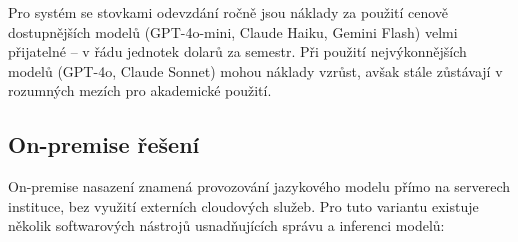 \begin{table}[H]
    \centering
    \caption{Přibližné ceny vybraných cloudových API modelů (stav 2024--2025) \cite{openai_api, anthropic_api, google_vertex}. Náklady na jedno odevzdání jsou orientační výpočet pro vstup 4\,000 tokenů a výstup 1\,000 tokenů.}
    \label{tab:cloud-api-costs}
\end{table}

Pro systém se stovkami odevzdání ročně jsou náklady za použití cenově dostupnějších modelů (GPT-4o-mini, Claude Haiku, Gemini Flash) velmi přijatelné -- v řádu jednotek dolarů za semestr.
Při použití nejvýkonnějších modelů (GPT-4o, Claude Sonnet) mohou náklady vzrůst, avšak stále zůstávají v rozumných mezích pro akademické použití.

\subsection{On-premise řešení}
\label{subsec:deployment-on-premise}

On-premise nasazení znamená provozování jazykového modelu přímo na serverech instituce, bez využití externích cloudových služeb.
Pro tuto variantu existuje několik softwarových nástrojů usnadňujících správu a inferenci modelů:

